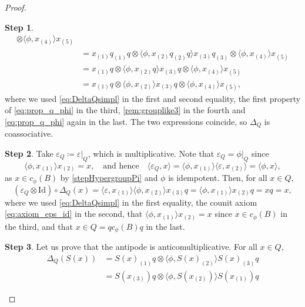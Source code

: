 \documentclass[a4paper,10pt]{amsart}
\newcommand{\eval}[2]{\langle #1 , #2\rangle}
\theoremstyle{definition}
\newtheorem{step-hypergroup}{Step}
\begin{document}
\begin{proof}
\begin{step-hypergroup}
\begin{align*}
            \otimes \eval{ \phi }{ x_{(4)} } x_{(5)}
            \\
        &=
            x_{(1)} q_{(1)} q
            \otimes  \eval{ \phi }{ x_{(2)} q_{(2)} q } x_{(3)} q_{(3)}
            \otimes \eval{ \phi }{ x_{(4)} } x_{(5)}
            \\
        &=
             x_{(1)}q
            \otimes \eval{\phi}{x_{(2)}q} x_{(3)} q
            \otimes \eval{\phi}{x_{(4)}} x_{(5)}
            \\
        &= 
            x_{(1)} q
            \otimes \eval{ \phi }{ x_{(2)} } x_{(3)} q
            \otimes  \eval{ \phi }{ x_{(4)} }  x_{(5)},
    \end{align*}
    where we used \cref{eq:DeltaQsimpl} in the first and second equality, the first property of \cref{eq:prop_q_phi} in the third, \cref{rem:grouplike3} in the fourth and \cref{eq:prop_q_phi} again in the last.
    The two expressions coincide, so $\Delta_Q$ is coassociative.
\end{step-hypergroup}
\begin{step-hypergroup}
Take $\varepsilon_Q \coloneqq \varepsilon|_Q$,
which is multiplicative.
Note that $\varepsilon_Q = \phi|_Q$ since
\[
    \eval{\phi}{x_{(1)}}x_{(2)}
    =
    x
    ,\quad\text{and hence}\quad
    \eval{\varepsilon_Q}{x}
    =
    \eval{\phi}{x_{(1)}}\eval{\varepsilon}{x_{(2)}}
    =
    \eval{\phi}{x},
\]
as $x\in c_\phi(B)$ by \cref{stepHypergroupPi} and $\phi$ is idempotent. Then, for all $x\in Q$,
\[
    ( \varepsilon_Q \otimes \mathrm{Id} ) \circ \Delta_Q(x)
    =
        \eval{ \varepsilon }{ x_{(1)} } \eval{ \phi }{ x_{(2)} } x_{(3)}q
    =
        \eval{ \phi }{ x_{(1)} } x_{(2)}q
    =
    xq = x,
\]
where we used \cref{eq:DeltaQsimpl} in the first equality, the counit axiom \cref{eq:axiom_eps_id} in the second, that $\eval{\phi}{x_{(1)}}x_{(2)} = x$ since $x\in c_{\phi}(B)$ in the third, and that $x\in Q = q c_\phi(B) q$ in the last.
\end{step-hypergroup}
\begin{step-hypergroup}
Let us prove that the antipode is anticomultiplicative. For all $x\in Q$,
\begin{align*}
    \Delta_Q( S(x) )
    &=
        S(x)_{(1)} q
            \otimes \eval{ \phi }{ S(x)_{(2)} } S(x)_{(3)} q
    \\
    &=
        S(x_{(3)}) q
            \otimes \eval{ \phi }{S(x_{(2)})} S(x_{(1)}) q

\end{align*}
\end{step-hypergroup}
\end{proof}
\end{document}
